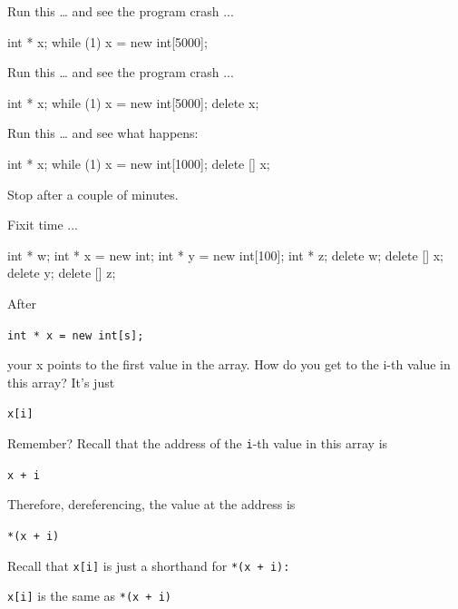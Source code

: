 \begin{ex}
Run this \ldots{} and see the program crash ...

\begin{consolethree}[escapeinside=||]
int * x;
while (1)
{
    x = new int[5000];
}
\end{consolethree}
\end{ex}

\begin{ex}
Run this \ldots{} and see the program crash ...

\begin{consolethree}[escapeinside=||]
int * x;
while (1)
{
    x = new int[5000];
    delete x;
}
\end{consolethree}
\end{ex}

\begin{ex}
Run this \ldots{} and see what happens:

\begin{consolethree}[escapeinside=||]
int * x;
while (1)
{
    x = new int[1000];
    delete [] x;
}
\end{consolethree}

Stop after a couple of minutes.
\end{ex}

\begin{ex}
Fixit time ...

\begin{consolethree}[escapeinside=||]
int * w;
int * x = new int;
int * y = new int[100];
int * z;
delete w;
delete [] x;
delete y;
delete [] z;
\end{consolethree}
\end{ex}

After

\verb!int * x = new int[s];!

your x points to the first value in the array. How do you get to the
i-th value in this array? It's just

\texttt{x[i]}

Remember? Recall that the address of the \texttt{i}-th value in this array
is

\texttt{x + i}

Therefore, dereferencing, the value at the address is

\texttt{*(x + i)}

Recall that \texttt{x[i]} is just a shorthand for \texttt{*(x + i):}

\texttt{x[i]} is the same as \texttt{*(x + i)}

